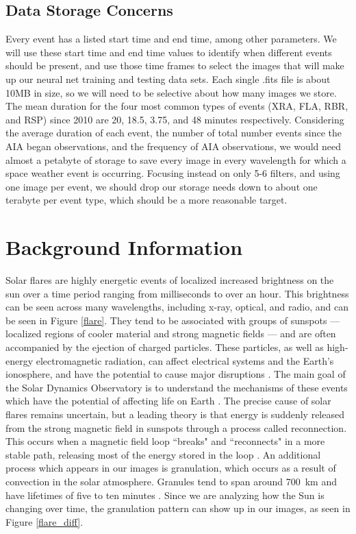 \documentclass[12pt, letterpaper]{article}
\begin{document}
\subsection*{Data Storage Concerns}
Every event has a listed start time and end time, among other parameters. We will use these start time and end time values to identify when different events should be present, and use those time frames to select the images that will make up our neural net training and testing data sets. Each single .fits file is about 10MB in size, so we will need to be selective about how many images we store. The mean duration for the four most common types of events (XRA, FLA, RBR, and RSP) since 2010 are 20, 18.5, 3.75, and 48 minutes respectively. Considering the average duration of each event, the number of total number events since the AIA began observations, and the frequency of AIA observations, we would need almost a petabyte of storage to save every image in every wavelength for which a space weather event is occurring. Focusing instead on only 5-6 filters, and using one image per event, we should drop our storage needs down to about one terabyte per event type, which should be a more reasonable target.

\section*{Background Information}

Solar flares are highly energetic events of localized increased brightness on the sun over a time period ranging from milliseconds to over an hour. This brightness can be seen across many wavelengths, including x-ray, optical, and radio, and can be seen in Figure \ref{flare}. They tend to be associated with groups of sunspots — localized regions of cooler material and strong magnetic fields — and are often accompanied by the ejection of charged particles. These particles, as well as high-energy electromagnetic radiation, can affect electrical systems and the Earth’s ionosphere, and have the potential to cause major disruptions \cite{BOB}. The main goal of the Solar Dynamics Observatory is to understand the mechanisms of these events which have the potential of affecting life on Earth \cite{Pesnell2012}. The precise cause of solar flares remains uncertain, but a leading theory is that energy is suddenly released from the strong magnetic field in sunspots through a process called reconnection. This occurs when a magnetic field loop ``breaks" and ``reconnects" in a more stable path, releasing most of the energy stored in the loop \cite{BOB}. An additional process which appears in our images is granulation, which occurs as a result of convection in the solar atmosphere. Granules tend to span around 700~km and have lifetimes of five to ten minutes \cite{BOB}. Since we are analyzing how the Sun is changing over time, the granulation pattern can show up in our images, as seen in Figure \ref{flare_diff}.
\end{document}
